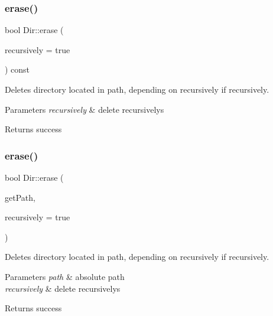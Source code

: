 \subsubsection{\texorpdfstring{erase()}{erase()}\hspace{0.1cm}{\footnotesize\ttfamily [1/2]}}
{\footnotesize\ttfamily bool Dir\+::erase (\begin{DoxyParamCaption}\item[{bool}]{recursively = {\ttfamily true} }\end{DoxyParamCaption}) const}



Deletes directory located in path, depending on recursively if recursively. 


\begin{DoxyParams}{Parameters}
{\em recursively} & delete recursivelys \\
\hline
\end{DoxyParams}
\begin{DoxyReturn}{Returns}
success 
\end{DoxyReturn}
\mbox{\label{class_dir_a4343d411cdea798d4744ef0d9db32b4a}} 
\subsubsection{\texorpdfstring{erase()}{erase()}\hspace{0.1cm}{\footnotesize\ttfamily [2/2]}}
{\footnotesize\ttfamily bool Dir\+::erase (\begin{DoxyParamCaption}\item[{const \mbox{\hyperlink{class_a_string}{A\+String}} \&}]{get\+Path,  }\item[{bool}]{recursively = {\ttfamily true} }\end{DoxyParamCaption})\hspace{0.3cm}{\ttfamily [static]}}



Deletes directory located in path, depending on recursively if recursively. 


\begin{DoxyParams}{Parameters}
{\em path} & absolute path \\
\hline
{\em recursively} & delete recursivelys \\
\hline
\end{DoxyParams}
\begin{DoxyReturn}{Returns}
success 
\end{DoxyReturn}
\mbox{\label{class_dir_ac6bf80b5b3a034e8c144c86ef48ae309}} 
